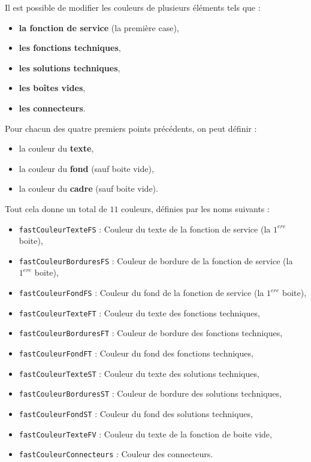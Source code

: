 		Il est possible de modifier les couleurs de plusieurs éléments tels que :
		\begin{itemize}
			\item \textbf{la fonction de service} (la première case),
			\item \textbf{les fonctions techniques},
			\item \textbf{les solutions techniques},
			\item \textbf{les boîtes vides},
			\item \textbf{les connecteurs}.
		\end{itemize}
		Pour chacun des quatre premiers points précédents, on peut définir :
		\begin{itemize}
			\item la couleur du \textbf{texte},
			\item la couleur du \textbf{fond} (sauf boite vide),
			\item la couleur du \textbf{cadre} (sauf boite vide).
		\end{itemize}
		Tout cela donne un total de $11$ couleurs, définies par les noms suivants :
		\begin{itemize}
			\item {\color{blue}\verb'fastCouleurTexteFS'} : Couleur du texte de la fonction de service (la $1^{ere}$ boite),
			\item {\color{blue}\verb'fastCouleurBorduresFS'} : Couleur de bordure de la fonction de service (la $1^{ere}$ boite),
			\item {\color{blue}\verb'fastCouleurFondFS'} : Couleur du fond de la fonction de service (la $1^{ere}$ boite),
			\item {\color{blue}\verb'fastCouleurTexteFT'} : Couleur du texte des fonctions techniques,
			\item {\color{blue}\verb'fastCouleurBorduresFT'} : Couleur de bordure des fonctions techniques,
			\item {\color{blue}\verb'fastCouleurFondFT'} : Couleur du fond des fonctions techniques,
			\item {\color{blue}\verb'fastCouleurTexteST'} : Couleur du texte des solutions techniques,
			\item {\color{blue}\verb'fastCouleurBorduresST'} : Couleur de bordure des solutions techniques,
			\item {\color{blue}\verb'fastCouleurFondST'} : Couleur du fond des solutions techniques,
			\item {\color{blue}\verb'fastCouleurTexteFV'} : Couleur du texte de la fonction de boite vide,
			\item {\color{blue}\verb'fastCouleurConnecteurs'} : Couleur des connecteurs.
		\end{itemize}


